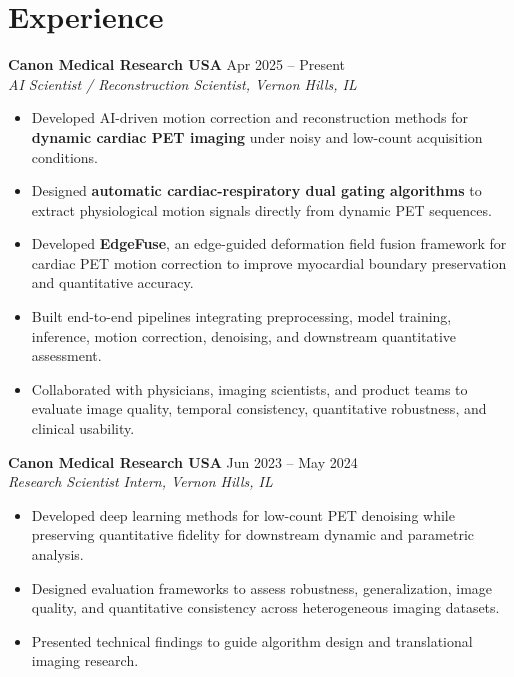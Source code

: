 \section{Experience}
\textbf{Canon Medical Research USA} \hfill Apr 2025 -- Present \\
\textit{AI Scientist / Reconstruction Scientist, Vernon Hills, IL}
\begin{itemize}[leftmargin=*]
\item Developed AI-driven motion correction and reconstruction methods for \textbf{dynamic cardiac PET imaging} under noisy and low-count acquisition conditions.
\item Designed \textbf{automatic cardiac-respiratory dual gating algorithms} to extract physiological motion signals directly from dynamic PET sequences.
\item Developed \textbf{EdgeFuse}, an edge-guided deformation field fusion framework for cardiac PET motion correction to improve myocardial boundary preservation and quantitative accuracy.
\item Built end-to-end pipelines integrating preprocessing, model training, inference, motion correction, denoising, and downstream quantitative assessment.
\item Collaborated with physicians, imaging scientists, and product teams to evaluate image quality, temporal consistency, quantitative robustness, and clinical usability.
\end{itemize}

\textbf{Canon Medical Research USA} \hfill Jun 2023 -- May 2024 \\
\textit{Research Scientist Intern, Vernon Hills, IL}
\begin{itemize}[leftmargin=*]
\item Developed deep learning methods for low-count PET denoising while preserving quantitative fidelity for downstream dynamic and parametric analysis.
\item Designed evaluation frameworks to assess robustness, generalization, image quality, and quantitative consistency across heterogeneous imaging datasets.
\item Presented technical findings to guide algorithm design and translational imaging research.
\end{itemize}

